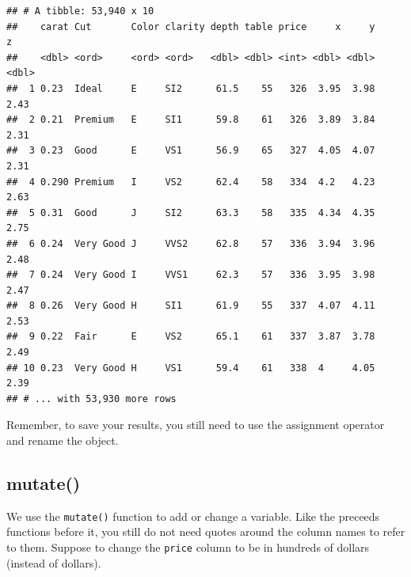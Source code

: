 \documentclass[
]{book}
\newenvironment{Shaded}{\begin{snugshade}}{\end{snugshade}}
\newcommand{\DataTypeTok}[1]{\textcolor[rgb]{0.13,0.29,0.53}{#1}}
\newcommand{\KeywordTok}[1]{\textcolor[rgb]{0.13,0.29,0.53}{\textbf{#1}}}
\newcommand{\NormalTok}[1]{#1}
\newcommand{\OperatorTok}[1]{\textcolor[rgb]{0.81,0.36,0.00}{\textbf{#1}}}
\newcommand{\StringTok}[1]{\textcolor[rgb]{0.31,0.60,0.02}{#1}}
\begin{document}
\begin{Shaded}
\end{Shaded}

\begin{verbatim}
## # A tibble: 53,940 x 10
##    carat Cut       Color clarity depth table price     x     y     z
##    <dbl> <ord>     <ord> <ord>   <dbl> <dbl> <int> <dbl> <dbl> <dbl>
##  1 0.23  Ideal     E     SI2      61.5    55   326  3.95  3.98  2.43
##  2 0.21  Premium   E     SI1      59.8    61   326  3.89  3.84  2.31
##  3 0.23  Good      E     VS1      56.9    65   327  4.05  4.07  2.31
##  4 0.290 Premium   I     VS2      62.4    58   334  4.2   4.23  2.63
##  5 0.31  Good      J     SI2      63.3    58   335  4.34  4.35  2.75
##  6 0.24  Very Good J     VVS2     62.8    57   336  3.94  3.96  2.48
##  7 0.24  Very Good I     VVS1     62.3    57   336  3.95  3.98  2.47
##  8 0.26  Very Good H     SI1      61.9    55   337  4.07  4.11  2.53
##  9 0.22  Fair      E     VS2      65.1    61   337  3.87  3.78  2.49
## 10 0.23  Very Good H     VS1      59.4    61   338  4     4.05  2.39
## # ... with 53,930 more rows
\end{verbatim}

Remember, to save your results, you still need to use the assignment operator and rename the object.

\begin{Shaded}
\end{Shaded}

\hypertarget{mutate}{%
\subsection{mutate()}\label{mutate}}

We use the \texttt{mutate()} function to add or change a variable. Like the preceeds functions before it, you still do not need quotes around the column names to refer to them. Suppose to change the \texttt{price} column to be in hundreds of dollars (instead of dollars).
\end{document}
